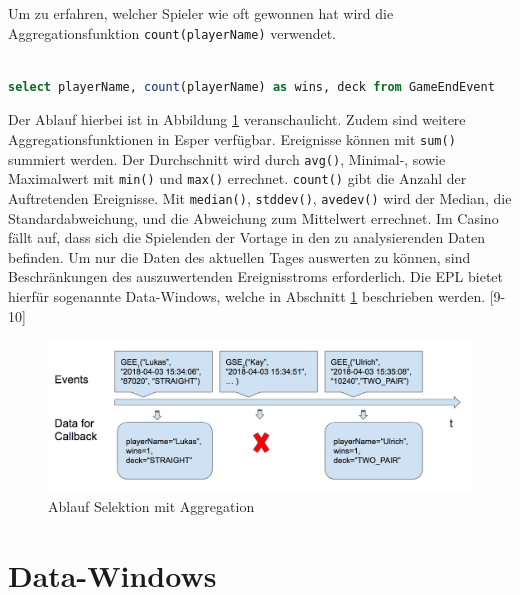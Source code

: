Um zu erfahren, welcher Spieler wie oft gewonnen hat wird die Aggregationsfunktion \texttt{count(playerName)} verwendet.
\begin{lstlisting}[caption={Statement mit Aggregation},label=aggregation_select,captionpos=b,language=SQL]

select playerName, count(playerName) as wins, deck from GameEndEvent

\end{lstlisting}
Der Ablauf hierbei ist in Abbildung \ref{aggregation_select_img} veranschaulicht. 
Zudem sind weitere Aggregationsfunktionen in Esper verfügbar.
Ereignisse können mit \texttt{sum()} summiert werden. Der Durchschnitt wird durch \texttt{avg()}, Minimal-, sowie Maximalwert mit \texttt{min()} und \texttt{max()} errechnet. \texttt{count()} gibt die Anzahl der Auftretenden Ereignisse. Mit \texttt{median()}, \texttt{stddev()}, \texttt{avedev()} wird der Median, die Standardabweichung, und die Abweichung zum Mittelwert errechnet.
Im Casino fällt auf, dass sich die Spielenden der Vortage in den zu analysierenden Daten befinden. Um nur die Daten des aktuellen Tages auswerten zu können, sind Beschränkungen des auszuwertenden Ereignisstroms erforderlich. Die \acf{EPL} bietet hierfür sogenannte Data-Windows, welche in Abschnitt \ref{Data-Windows} beschrieben werden.
\cite{EsperRef2018}[9-10]

\begin{figure}[ht]
	\centering
	\includegraphics[width=\textwidth,height=\textheight, keepaspectratio]{images/statement_basic_aggregation.png}
	\caption{Ablauf Selektion mit Aggregation}
	\label{aggregation_select_img}
\end{figure}

\section{Data-Windows}
\label{Data-Windows}

